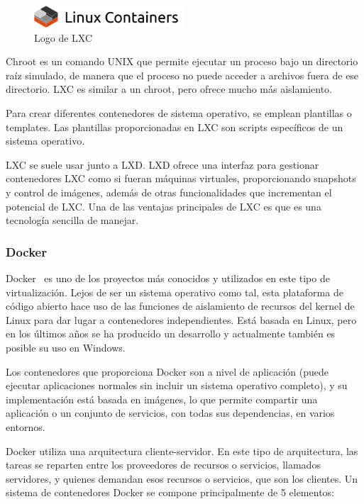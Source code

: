 \begin{figure}[h]
\centering
\includegraphics[width=0.5\textwidth]{../imgs/EdA/lxc.png}
\caption{Logo de LXC}
\label{fig:lxc}
\end{figure}

Chroot es un comando UNIX que permite ejecutar un proceso bajo un directorio raíz simulado, de manera que el proceso no puede acceder a archivos fuera de ese directorio. LXC es similar a un chroot, pero ofrece mucho más aislamiento. 

Para crear diferentes contenedores de sistema operativo, se emplean plantillas o templates. Las plantillas proporcionadas en LXC son scripts específicos de un sistema operativo.

LXC se suele usar junto a LXD. LXD ofrece una interfaz para gestionar contenedores LXC como si fueran máquinas virtuales, proporcionando snapshots y control de imágenes, además de otras funcionalidades que incrementan el potencial de LXC. Una de las ventajas principales de LXC es que es una tecnología sencilla de manejar.

\subsubsection{Docker}
Docker~\cite{docker1} es uno de los proyectos más conocidos y utilizados en este tipo de virtualización. Lejos de ser un sistema operativo como tal, esta plataforma de código abierto hace uso de las funciones de aislamiento de recursos del kernel de Linux para dar lugar a contenedores independientes. Está basada en Linux, pero en los últimos años se ha producido un desarrollo y actualmente también es posible su uso en Windows.

Los contenedores que proporciona Docker son a nivel de aplicación (puede ejecutar aplicaciones normales sin incluir un sistema operativo completo), y su implementación está basada en imágenes, lo que permite compartir una aplicación o un conjunto de servicios, con todas sus dependencias, en varios entornos.

Docker utiliza una arquitectura cliente-servidor. En este tipo de arquitectura, las tareas se reparten entre los proveedores de recursos o servicios, llamados servidores, y quienes demandan esos recursos o servicios, que son los clientes. Un sistema de contenedores Docker se compone principalmente de 5 elementos:~\cite{docker2}

